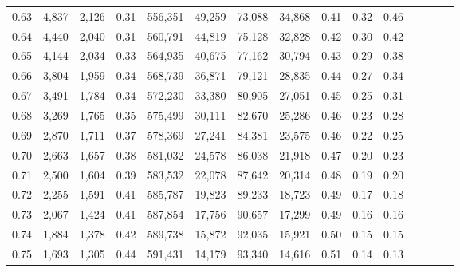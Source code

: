 \begin{tabular}{rrrcrrrrrrrrrrr}
0.63 &   4,837 &  2,126 &                                       0.31 &  556,351 &   49,259 &   73,088 &   34,868 &  0.41 &  0.32 &                         0.46 \\
0.64 &   4,440 &  2,040 &                                       0.31 &  560,791 &   44,819 &   75,128 &   32,828 &  0.42 &  0.30 &                         0.42 \\
0.65 &   4,144 &  2,034 &                                       0.33 &  564,935 &   40,675 &   77,162 &   30,794 &  0.43 &  0.29 &                         0.38 \\
0.66 &   3,804 &  1,959 &                                       0.34 &  568,739 &   36,871 &   79,121 &   28,835 &  0.44 &  0.27 &                         0.34 \\
0.67 &   3,491 &  1,784 &                                       0.34 &  572,230 &   33,380 &   80,905 &   27,051 &  0.45 &  0.25 &                         0.31 \\
0.68 &   3,269 &  1,765 &                                       0.35 &  575,499 &   30,111 &   82,670 &   25,286 &  0.46 &  0.23 &                         0.28 \\
0.69 &   2,870 &  1,711 &                                       0.37 &  578,369 &   27,241 &   84,381 &   23,575 &  0.46 &  0.22 &                         0.25 \\
0.70 &   2,663 &  1,657 &                                       0.38 &  581,032 &   24,578 &   86,038 &   21,918 &  0.47 &  0.20 &                         0.23 \\
0.71 &   2,500 &  1,604 &                                       0.39 &  583,532 &   22,078 &   87,642 &   20,314 &  0.48 &  0.19 &                         0.20 \\
0.72 &   2,255 &  1,591 &                                       0.41 &  585,787 &   19,823 &   89,233 &   18,723 &  0.49 &  0.17 &                         0.18 \\
0.73 &   2,067 &  1,424 &                                       0.41 &  587,854 &   17,756 &   90,657 &   17,299 &  0.49 &  0.16 &                         0.16 \\
0.74 &   1,884 &  1,378 &                                       0.42 &  589,738 &   15,872 &   92,035 &   15,921 &  0.50 &  0.15 &                         0.15 \\
0.75 &   1,693 &  1,305 &                                       0.44 &  591,431 &   14,179 &   93,340 &   14,616 &  0.51 &  0.14 &                         0.13 \\

\end{tabular}
